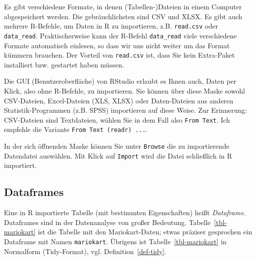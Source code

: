 \documentclass[
  letterpaper,
  oneside,
  open=any]{scrbook}
\theoremstyle{definition}
\theoremstyle{definition}
\theoremstyle{definition}
\theoremstyle{remark}
\begin{document}
\begin{figure}


\caption{\label{fig-upload-to-posit-cloud}}

\end{figure}%

Es gibt verschiedene Formate, in denen (Tabellen-)Dateien in einem
Computer abgespeichert werden. Die gebräuchlichsten sind CSV und XLSX.
Es gibt auch mehrere R-Befehle, um Daten in R zu importieren, z.B.
\texttt{read.csv} oder \texttt{data\_read}. Praktischerweise kann der
R-Befehl \texttt{data\_read} viele verschiedene Formate automatisch
einlesen, so dass wir uns nicht weiter um das Format kümmern brauchen.
Der Vorteil von \texttt{read.csv} ist, dass Sie kein Extra-Paket
installiert bzw. gestartet haben müssen.

Die GUI (Benutzeroberfläche) von RStudio erlaubt es Ihnen auch, Daten
per Klick, also ohne R-Befehle, zu importieren. Sie können über diese
Maske sowohl CSV-Dateien, Excel-Dateien (XLS, XLSX) oder Daten-Dateien
aus anderen Statistik-Programmen (z.B. SPSS) importieren auf diese
Weise. Zur Erinnerung: CSV-Dateien sind Textdateien, wählen Sie in dem
Fall also \texttt{From\ Text}. Ich empfehle die Variante
\texttt{From\ Text\ (readr)\ ...}.

In der sich öffnenden Maske können Sie unter \texttt{Browse} die zu
importierende Datendatei auswählen. Mit Klick auf \texttt{Import} wird
die Datei schließlich in R importiert.

\subsection{Dataframes}\label{dataframes}

Eine in R importierte Tabelle (mit bestimmten Eigenschaften) heißt
\emph{Dataframe}. Dataframes sind in der Datenanalyse von großer
Bedeutung. Tabelle~\ref{tbl-mariokart} ist die Tabelle mit den
Mariokart-Daten; etwas präziser gesprochen ein Dataframe mit Namen
\texttt{mariokart}. Übrigens ist Tabelle~\ref{tbl-mariokart} in
Normalform (Tidy-Format), vgl. Definition~\ref{def-tidy}.
\end{document}
